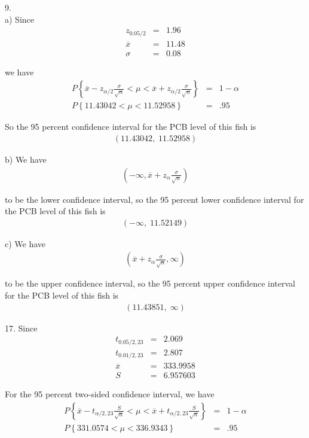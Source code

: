 \documentclass[12pt]{article}
\begin{document}
9. \\
a) Since
\begin{eqnarray*}
  z_{0.05/2} &=& 1.96 \\
  \overline{x} &=& 11.48 \\
  \sigma &=& 0.08
\end{eqnarray*}

we have
\begin{eqnarray*}
  P \left\{ \overline{x} - z_{\alpha / 2} \frac {\sigma}{\sqrt{n}} < \mu
    < \overline{x} + z_{\alpha / 2} \frac {\sigma}{\sqrt{n}}
  \right\} &=& 1 - \alpha \\
  P \left\{ 11.43042 < \mu < 11.52958 \right\} &=& .95
\end{eqnarray*}

So the 95 percent confidence interval for the PCB level of this fish is
\begin{eqnarray*}
  \left( 11.43042, \; 11.52958 \right)
\end{eqnarray*}

b) We have
\begin{eqnarray*}
    \left( -\infty, \overline{x} + z_{\alpha} \frac {\sigma}{\sqrt{n}} \right)
\end{eqnarray*}

to be the lower confidence interval, so the 95 percent lower confidence interval for the PCB level of this fish is
\begin{eqnarray*}
  \left( - \infty, \; 11.52149 \right)
\end{eqnarray*}

c) We have
\begin{eqnarray*}
    \left( \overline{x} + z_{\alpha} \frac {\sigma}{\sqrt{n}}, \infty \right)
\end{eqnarray*}

to be the upper confidence interval, so the 95 percent upper confidence interval for the PCB level of this fish is
\begin{eqnarray*}
  \left( 11.43851, \; \infty \right)
\end{eqnarray*}

17. Since
\begin{eqnarray*}
  t_{0.05/2, 23} &=& 2.069 \\
  t_{0.01/2, 23} &=& 2.807 \\
  \overline{x} &=& 333.9958 \\
  S &=& 6.957603
\end{eqnarray*}

For the 95 percent two-sided confidence interval, we have
\begin{eqnarray*}
  P \left\{ \overline{x} - t_{\alpha / 2, 23} \frac {S}{\sqrt{n}} < \mu
    < \overline{x} + t_{\alpha / 2, 23} \frac {S}{\sqrt{n}}
  \right\} &=& 1 - \alpha \\
  P \left\{ 331.0574 < \mu < 336.9343 \right\} &=& .95
\end{eqnarray*}
\end{document}

